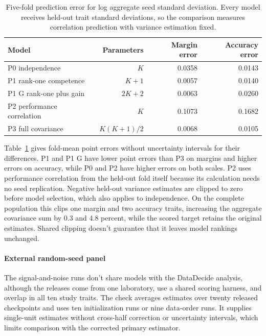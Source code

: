\begin{table}[htbp]
\centering\small
\caption{Five-fold prediction error for log aggregate seed standard deviation. Every model receives held-out trait standard deviations, so the comparison measures correlation prediction with variance estimation fixed.}
\label{tab:original11}
\begin{tabular}{lrrr}\hline
Model & Parameters & Margin error & Accuracy error\\\hline
P0 independence & $K$ & 0.0358 & 0.0143\\
P1 rank-one competence & $K+1$ & 0.0057 & 0.0140\\
P1 G rank-one plus gain & $2K+2$ & 0.0063 & 0.0260\\
P2 performance correlation & $K$ & 0.1073 & 0.1682\\
P3 full covariance & $K(K+1)/2$ & 0.0068 & 0.0105\\\hline
\end{tabular}
\end{table}

Table~\ref{tab:original11} gives fold-mean point errors without uncertainty intervals for their differences. P1 and P1 G have lower point errors than P3 on margins and higher errors on accuracy, while P0 and P2 have higher errors on both scales. P2 uses performance correlation from the held-out fold itself because its calculation needs no seed replication. Negative held-out variance estimates are clipped to zero before model selection, which also applies to independence. On the complete population this clips one margin and two accuracy traits, increasing the aggregate covariance sum by 0.3 and 4.8 percent, while the scored target retains the original estimates. Shared clipping doesn't guarantee that it leaves model rankings unchanged.

\paragraph{External random-seed panel}
The signal-and-noise runs don't share models with the DataDecide analysis, although the releases come from one laboratory, use a shared scoring harness, and overlap in all ten study traits. The check averages estimates over twenty released checkpoints and uses ten initialization runs or nine data-order runs. It supplies single-unit estimates without cross-half correction or uncertainty intervals, which limits comparison with the corrected primary estimator.

